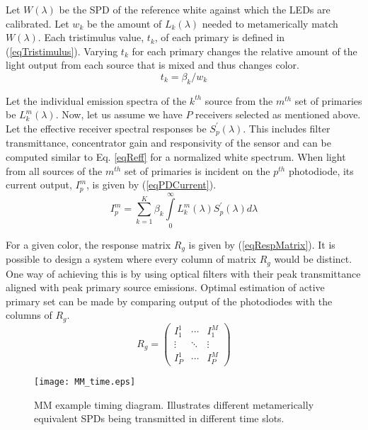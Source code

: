 Let $W(\lambda)$ be the SPD of the reference white against which the LEDs are calibrated. Let $w_{k}$ be the amount of $L_{k}(\lambda)$ needed to metamerically match $W(\lambda)$. Each tristimulus value, $t_{k}$, of each primary is defined in (\ref{eqTristimulus}). Varying $t_{k}$ for each primary changes the relative amount of the light output from each source that is mixed and thus changes color.
\begin{equation}
	\label{eqTristimulus}
	t_{k} = \beta_{k}/ w_{k}
\end{equation}

Let the individual emission spectra of the $k^{th}$ source from the $m^{th}$ set of primaries be  $L_{k}^{m}(\lambda)$. Now, let us assume we have $P$ receivers selected as mentioned above. Let the effective receiver spectral responses be $S_{p}^{'}(\lambda)$. This includes filter transmittance, concentrator gain and responsivity of the sensor and can be computed similar to Eq. \eqref{eqReff} for a normalized white spectrum. When light from all sources of the $m^{th}$ set of primaries is incident on the $p^{th}$ photodiode, its current output, $I_{p}^{m}$, is given by (\ref{eqPDCurrent}). 
\begin{equation}
	\label{eqPDCurrent}
	I_{p}^{m} = \sum\limits_{k=1}^{K} \beta_{k}\int\limits_{0}^{\infty} L_{k}^{m}(\lambda)S_{p}^{'}(\lambda)d\lambda
\end{equation}

For a given color, the response matrix $R_{g}$ is given by (\ref{eqRespMatrix}). It is possible to design a system where every column of matrix $R_{g}$ would be distinct. One way of achieving this is by using optical filters with their peak transmittance aligned with peak primary source emissions. Optimal estimation of active primary set can be made by comparing output of the photodiodes with the columns of $R_{g}$.
\begin{equation}
	\label{eqRespMatrix}
R_{g} = \left( \begin{array}{ccc}
I_{1}^{1}&\cdots&I_{1}^{M}\\
\vdots&\ddots&\vdots\\
I_{P}^{1}&\cdots&I_{P}^{M}
\end{array} \right)
\end{equation}

\begin{figure}[!t]
	\centering
    \texttt{[image: MM\_time.eps]}
	\caption[MM example timing diagram]{MM example timing diagram. Illustrates different metamerically equivalent SPDs being transmitted in different time slots.}
	\label{figMMex}
\end{figure}

